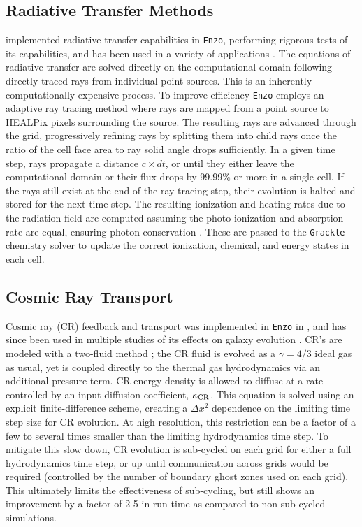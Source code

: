 \documentclass[11pt]{article}
\begin{document}
\subsection{Radiative Transfer Methods}

\cite{WiseAbel2011} implemented radiative transfer capabilities in \texttt{Enzo}, performing rigorous tests of its capabilities, and has been used in a variety of applications \citep[e.g.][]{Wise2012a,WiseAbel2012,Wise2014, Smith2015, OShea2015, Koh2016, Regan2016a, Regan2016b}. The equations of radiative transfer are solved directly on the computational domain following directly traced rays from individual point sources. This is an inherently computationally expensive process. To improve efficiency \texttt{Enzo} employs an adaptive ray tracing method \citep{AbelWandelt2002} where rays are mapped from a point source to HEALPix pixels surrounding the source. The resulting rays are advanced through the grid, progressively refining rays by splitting them into child rays once the ratio of the cell face area to ray solid angle drops sufficiently. In a given time step, rays propagate a distance $c\times dt$, or until they either leave the computational domain or their flux drops by 99.99\% or more in a single cell. If the rays still exist at the end of the ray tracing step, their evolution is halted and stored for the next time step. The resulting ionization and heating rates due to the radiation field are computed assuming the photo-ionization and absorption rate are equal, ensuring photon conservation \citep{Abel1999, Mellema2006}. These are passed to the \texttt{Grackle} chemistry solver to update the correct ionization, chemical, and energy states in each cell.

\subsection{Cosmic Ray Transport}

Cosmic ray (CR) feedback and transport was implemented in \texttt{Enzo} in \cite{SalemBryan2014}, and has since been used in multiple studies of its effects on galaxy evolution \citep{SalemBryanHummels, SalemBryanCorlies, Chen2016}. CR's are modeled with a two-fluid method \citep{Drury1985, DruryFalle1986,Jun1994}; the CR fluid is evolved as a $\gamma = 4/3$ ideal gas as usual, yet is coupled directly to the thermal gas hydrodynamics via an additional pressure term. CR energy density is allowed to diffuse at a rate controlled by an input diffusion coefficient, $\kappa_{\rm CR}$. This equation is solved using an explicit finite-difference scheme, creating a $\Delta x^2$ dependence on the limiting time step size for CR evolution. At high resolution, this restriction can be a factor of a few to several times smaller than the limiting hydrodynamics time step. To mitigate this slow down, CR evolution is sub-cycled on each grid for either a full hydrodynamics time step, or up until communication across grids would be required (controlled by the number of boundary ghost zones used on each grid). This ultimately limits the effectiveness of sub-cycling, but still shows an improvement by a factor of 2-5 in run time as compared to non sub-cycled simulations.
\end{document}
